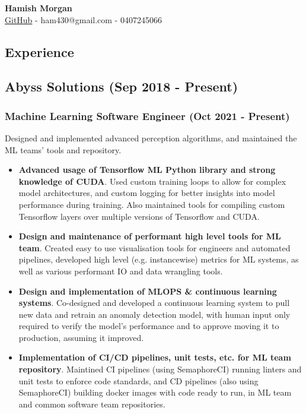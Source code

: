 \documentclass[12pt]{article}
\begin{document}
\begin{center}
  \Large
  \vspace{0.8cm}
  \textbf{Hamish Morgan}\\
  \vspace{0.8cm}
  \large
  \href{https://github.com/hacmorgan}{GitHub} - ham430@gmail.com - 0407245066
  
\end{center}


\begin{FlushLeft}
  
  \section{Experience}
  
  \subsection{Abyss Solutions (Sep 2018 - Present)}
  
  \subsubsection{Machine Learning Software Engineer (Oct 2021 - Present)}
  Designed and implemented advanced perception algorithms, and maintained the ML teams' tools and repository. \\

  \begin{itemize}
  \item \textbf{Advanced usage of Tensorflow ML Python library and strong knowledge of CUDA}. Used custom training loops to allow for complex model architectures, and custom logging for better insights into model performance during training. Also maintained tools for compiling custom Tensorflow layers over multiple versions of Tensorflow and CUDA. \\
  \item \textbf{Design and maintenance of performant high level tools for ML team}. Created easy to use visualisation tools for engineers and automated pipelines, developed high level (e.g. instancewise) metrics for ML systems, as well as various performant IO and data wrangling tools. \\
  \item \textbf{Design and implementation of MLOPS \& continuous learning systems}. Co-designed and developed a continuous learning system to pull new data and retrain an anomaly detection model, with human input only required to verify the model's performance and to approve moving it to production, assuming it improved.
  \item \textbf{Implementation of CI/CD pipelines, unit tests, etc. for ML team repository}. Maintined CI pipelines (using SemaphoreCI) running linters and unit tests to enforce code standards, and CD pipelines (also using SemaphoreCI) building docker images with code ready to run, in ML team and common software team repositories.
  \end{itemize}
  

\end{FlushLeft}
\end{document}
